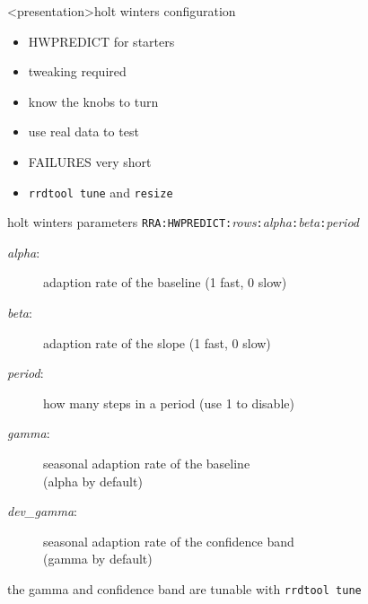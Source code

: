 \begin{frame}<presentation>{holt winters configuration}
\begin{itemize}
\item HWPREDICT for starters
\item tweaking required
\item know the knobs to turn
\item use real data to test
\item FAILURES very short
\item \texttt{rrdtool tune} and \texttt{resize}
\end{itemize}
\end{frame}


\begin{frame}{holt winters parameters}
\texttt{RRA:HWPREDICT:}\emph{rows}\texttt{:}\emph{alpha}\texttt{:}\emph{beta}\texttt{:}\emph{period}

\begin{description}
\item[\emph{alpha}:] adaption rate of the baseline (1 fast, 0 slow)
\item[\emph{beta}:] adaption rate of the slope (1 fast, 0 slow)
\item[\emph{period}:] how many steps in a period (use 1 to  disable)
\item[\emph{gamma}:] seasonal adaption rate of the baseline\\(alpha by
  default)
\item[\emph{dev\_gamma}:] seasonal adaption rate of the confidence
  band\\
 (gamma by default)
\end{description}

the gamma and confidence band are tunable with \texttt{rrdtool tune}
\end{frame}

